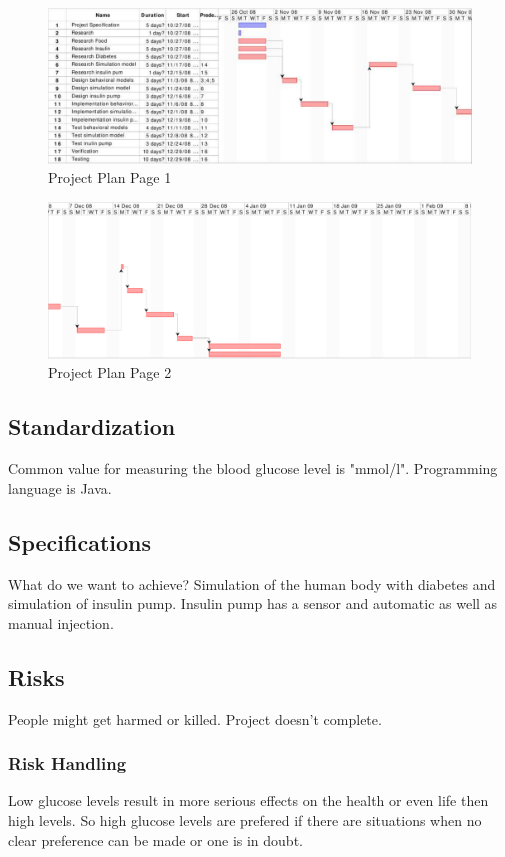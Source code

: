 \documentclass[pdflatex,a4paper,11pt,english]{scrreprt}
\begin{document}
\begin{figure}[htb]
\centering
\includegraphics[width=\textwidth]{images/projectplan_page1}
\caption{
Project Plan Page 1
\label{fig:projectplan1}
}
\end{figure}

\begin{figure}[htb]
\centering
\includegraphics[width=\textwidth]{images/projectplan_page2}
\caption{
Project Plan Page 2
\label{fig:projectplan2}
}
\end{figure}
\newpage %

\subsection{Standardization}
Common value for measuring the blood glucose level is "mmol/l".
Programming language is Java.

\subsection{Specifications}
What do we want to achieve?
Simulation of the human body with diabetes and simulation of insulin pump.
Insulin pump has a sensor and automatic as well as manual injection.

\subsection{Risks}
People might get harmed or killed.
Project doesn't complete.

\subsubsection{Risk Handling}
Low glucose levels result in more serious effects on the health or even life then high levels.
So high glucose levels are prefered if there are situations when no clear preference can be made or one is in doubt.
\end{document}
